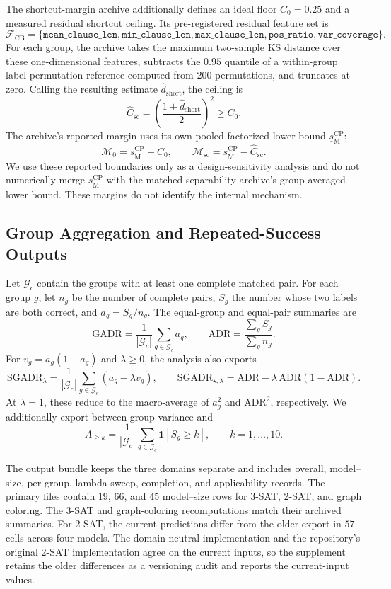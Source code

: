 \documentclass[acmsmall,screen,review,anonymous]{acmart}
\providecommand{\SepCPM}{\underline{s}^{\mathrm{CP}}_{\mathrm{M}}}
\providecommand{\MarginZero}{\mathcal{M}_{0}}
\providecommand{\MarginShortcut}{\mathcal{M}_{\mathrm{sc}}}
\begin{document}
The shortcut-margin archive additionally defines an ideal floor
\(C_0=0.25\) and a measured residual shortcut ceiling. Its pre-registered
residual feature set is
\[
\mathcal{F}_{\mathrm{CB}}
=
\{
\texttt{mean\_clause\_len},
\texttt{min\_clause\_len},
\texttt{max\_clause\_len},
\texttt{pos\_ratio},
\texttt{var\_coverage}
\}.
\]
For each group, the archive takes the maximum two-sample KS distance over
these one-dimensional features, subtracts the \(0.95\) quantile of a
within-group label-permutation reference computed from \(200\) permutations,
and truncates at zero. Calling the resulting estimate
\(\hat d_{\mathrm{short}}\), the ceiling is
\[
\widehat C_{\mathrm{sc}}
=
\left(\frac{1+\hat d_{\mathrm{short}}}{2}\right)^2
\ge C_0.
\]
The archive's reported margin uses its own pooled factorized lower bound
\(\SepCPM\):
\[
\MarginZero=\SepCPM-C_0,
\qquad
\MarginShortcut=\SepCPM-\widehat C_{\mathrm{sc}}.
\]
We use these reported boundaries only as a design-sensitivity analysis and do
not numerically merge \(\SepCPM\) with the matched-separability archive's
group-averaged lower bound. These margins do not identify the internal
mechanism.

\subsection{Group Aggregation and Repeated-Success Outputs}
\label{sec:supp-group-definitions}

Let \(\mathcal{G}_{c}\) contain the groups with at least one complete matched
pair. For each group \(g\), let \(n_g\) be the number of complete pairs,
\(S_g\) the number whose two labels are both correct, and
\(a_g=S_g/n_g\). The equal-group and equal-pair summaries are
\[
\mathrm{GADR}
=\frac{1}{|\mathcal{G}_{c}|}\sum_{g\in\mathcal{G}_{c}}a_g,
\qquad
\mathrm{ADR}
=\frac{\sum_g S_g}{\sum_g n_g}.
\]
For \(v_g=a_g(1-a_g)\) and \(\lambda\ge0\), the analysis also exports
\[
\mathrm{SGADR}_{\lambda}
=\frac{1}{|\mathcal{G}_{c}|}
\sum_{g\in\mathcal{G}_{c}}(a_g-\lambda v_g),
\qquad
\mathrm{SGADR}_{\star,\lambda}
=\mathrm{ADR}-\lambda\,\mathrm{ADR}(1-\mathrm{ADR}).
\]
At \(\lambda=1\), these reduce to the macro-average of \(a_g^2\) and
\(\mathrm{ADR}^2\), respectively. We additionally export between-group
variance and
\[
A_{\ge k}
=\frac{1}{|\mathcal{G}_{c}|}
\sum_{g\in\mathcal{G}_{c}}\mathbf{1}[S_g\ge k],
\qquad k=1,\ldots,10.
\]

The output bundle keeps the three domains separate and includes overall,
model--size, per-group, lambda-sweep, completion, and applicability records.
The primary files contain \(19\), \(66\), and \(45\) model--size rows for
3-SAT, 2-SAT, and graph coloring. The 3-SAT and graph-coloring recomputations
match their archived summaries. For 2-SAT, the current predictions differ
from the older export in \(57\) cells across four models. The domain-neutral
implementation and the repository's original 2-SAT implementation agree on
the current inputs, so the supplement retains the older differences as a
versioning audit and reports the current-input values.
\end{document}
